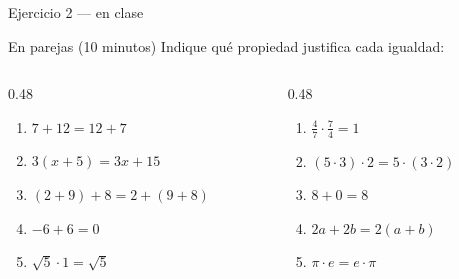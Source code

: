 \documentclass[aspectratio=169,10pt]{beamer}
\begin{document}
\begin{frame}{Ejercicio 2 — en clase}
  \begin{alertblock}{En parejas (10 minutos)}
    \scriptsize
    Indique qué propiedad justifica cada igualdad:

    \vspace{0.25cm}
    \begin{columns}[T,onlytextwidth]
      \begin{column}{0.48\textwidth}
        \begin{enumerate}\setlength{\itemsep}{0.05cm}
          \item $7 + 12 = 12 + 7$
          \item $3(x+5) = 3x + 15$
          \item $(2+9)+8 = 2+(9+8)$
          \item $-6 + 6 = 0$
          \item $\sqrt{5}\cdot 1 = \sqrt{5}$
        \end{enumerate}
      \end{column}
      \begin{column}{0.48\textwidth}
        \begin{enumerate}\setlength{\itemsep}{0.05cm}
          \setcounter{enumi}{5}
          \item $\tfrac{4}{7}\cdot\tfrac{7}{4} = 1$
          \item $(5\cdot 3)\cdot 2 = 5\cdot(3\cdot 2)$
          \item $8 + 0 = 8$
          \item $2a + 2b = 2(a+b)$
          \item $\pi \cdot e = e \cdot \pi$
        \end{enumerate}
      \end{column}
    \end{columns}
  \end{alertblock}
\end{frame}
\end{document}
